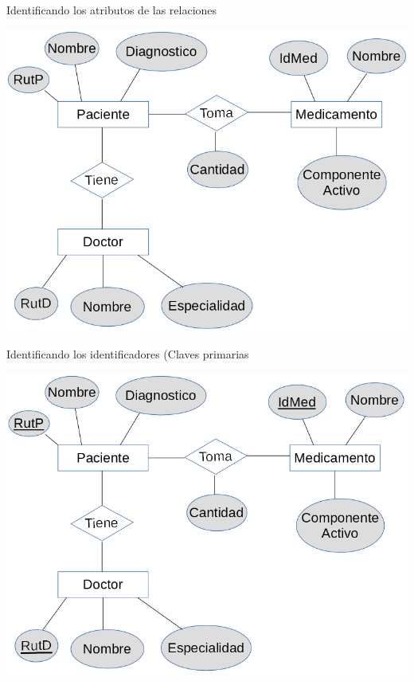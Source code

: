 \documentclass[11pt]{beamer}
\begin{document}
\begin{frame}{Identificando los atributos de las relaciones}


\begin{center}
\includegraphics[scale=.47]{images/4} 
\end{center}

\end{frame}

\begin{frame}{Identificando los identificadores (Claves primarias}


\begin{center}
\includegraphics[scale=.47]{images/5} 
\end{center}

\end{frame}
\end{document}
